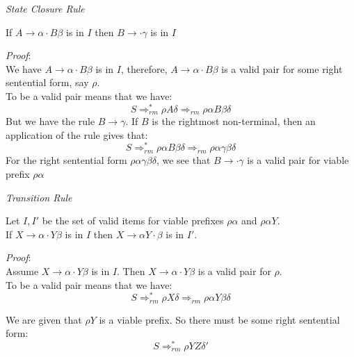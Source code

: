 \frmrule 

\textit{State Closure Rule}

If $A \rightarrow \alpha \cdot B \beta$ is in $I$ then 
$B \rightarrow \cdot \gamma$ is in $I$

\textit{Proof}: \\
We have $A \rightarrow \alpha \cdot B \beta$ is in $I$,  
therefore, $A \rightarrow \alpha \cdot B \beta$ is a valid pair for some 
right sentential form, say $\rho$. \\
To be a valid pair means that we have:
$$S \Rightarrow^{*}_{rm} \rho A \delta \Rightarrow_{rm} \rho\alpha B\beta\delta$$
But we have the rule $B \rightarrow \gamma$. 
If $B$ is the rightmost non-terminal, then an application of the rule gives that:
$$S \Rightarrow^{*}_{rm} \rho\alpha B\beta\delta \Rightarrow_{rm} \rho\alpha \gamma \beta\delta$$
For the right sentential form $\rho\alpha \gamma \beta\delta$, 
we see that $B \rightarrow \cdot \gamma$ is a valid pair for viable prefix $\rho\alpha$

\frmrule 

\textit{Transition Rule}

Let $I,I'$ be the set of valid items for viable prefixes $\rho\alpha$ and $\rho\alpha Y$. \\
If $X \rightarrow \alpha \cdot Y \beta$ is in $I$ then 
$X \rightarrow \alpha Y \cdot \beta $ is in $I'$.

\textit{Proof}: \\
Assume $X \rightarrow \alpha \cdot Y \beta$ is in $I$.  
Then $X \rightarrow \alpha \cdot Y \beta$ is a valid pair for $\rho$. \\
To be a valid pair means that we have:
$$S \Rightarrow^{*}_{rm} \rho X \delta \Rightarrow_{rm} \rho\alpha Y\beta\delta$$

We are given that $\rho Y$ is a viable prefix. 
So there must be some right sentential form:
$$S \Rightarrow^{*}_{rm} \rho Y Z \delta'$$

\frmrule 









